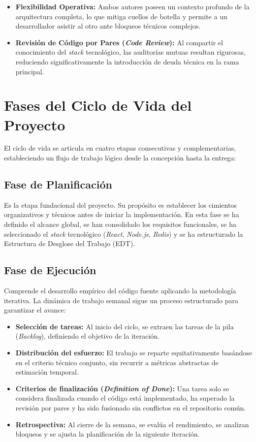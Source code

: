 \begin{itemize}
    \item \textbf{Flexibilidad Operativa:} Ambos autores poseen un contexto profundo de la arquitectura completa, lo que mitiga cuellos de botella y permite a un desarrollador asistir al otro ante bloqueos técnicos complejos.
    \item \textbf{Revisión de Código por Pares (\textit{Code Review}):} Al compartir el conocimiento del \textit{stack} tecnológico, las auditorías mutuas resultan rigurosas, reduciendo significativamente la introducción de deuda técnica en la rama principal.
\end{itemize}

\section{Fases del Ciclo de Vida del Proyecto}

El ciclo de vida se articula en cuatro etapas consecutivas y complementarias, estableciendo un flujo de trabajo lógico desde la concepción hasta la entrega:

\subsection{Fase de Planificación}
Es la etapa fundacional del proyecto. Su propósito es establecer los cimientos organizativos y técnicos antes de iniciar la implementación. En esta fase se ha definido el alcance global, se han consolidado los requisitos funcionales, se ha seleccionado el \textit{stack} tecnológico (\textit{React}, \textit{Node.js}, \textit{Redis}) y se ha estructurado la Estructura de Desglose del Trabajo (EDT).

\subsection{Fase de Ejecución}
Comprende el desarrollo empírico del código fuente aplicando la metodología iterativa. La dinámica de trabajo semanal sigue un proceso estructurado para garantizar el avance:
\begin{itemize}
    \item \textbf{Selección de tareas:} Al inicio del ciclo, se extraen las tareas de la pila (\textit{Backlog}), definiendo el objetivo de la iteración.
    \item \textbf{Distribución del esfuerzo:} El trabajo se reparte equitativamente basándose en el criterio técnico conjunto, sin recurrir a métricas abstractas de estimación temporal.
    \item \textbf{Criterios de finalización (\textit{Definition of Done}):} Una tarea solo se considera finalizada cuando el código está implementado, ha superado la revisión por pares y ha sido fusionado sin conflictos en el repositorio común.
    \item \textbf{Retrospectiva:} Al cierre de la semana, se evalúa el rendimiento, se analizan bloqueos y se ajusta la planificación de la siguiente iteración.
\end{itemize}

